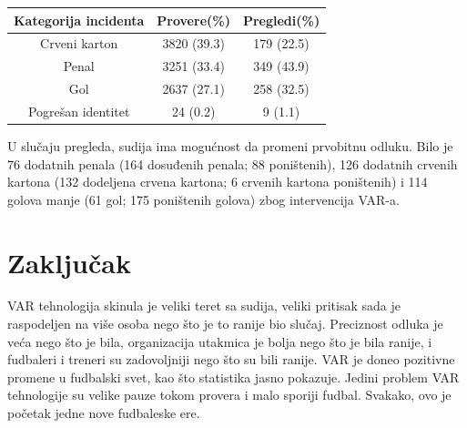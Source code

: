 \documentclass[a4paper]{article}
\begin{document}
\begin{center}
\begin{tabular}{ |c|c|c| } 
\hline
Kategorija incidenta & Provere(\%) & Pregledi(\%) \\  \hline
 Crveni karton & 3820 (39.3) & 179 (22.5) \\ \hline
 Penal & 3251 (33.4) & 349 (43.9) \\ \hline
 Gol & 2637 (27.1) & 258 (32.5) \\ \hline
 Pogrešan identitet & 24 (0.2) & 9 (1.1) \\
 \hline
\end{tabular}
\end{center}

U slučaju pregleda, sudija ima mogućnost da promeni prvobitnu odluku. Bilo je 76 dodatnih penala (164 dosuđenih penala; 88 poništenih), 126 dodatnih crvenih kartona (132 dodeljena crvena kartona; 6 crvenih kartona poništenih) i 114 golova manje (61 gol; 175 poništenih golova) zbog intervencija VAR-a.

\section{Zaključak}
VAR tehnologija skinula je veliki teret sa sudija, veliki pritisak sada je raspodeljen na više osoba nego što je to ranije bio slučaj. Preciznost odluka je veća nego što je bila, organizacija utakmica je bolja nego što je bila ranije, i fudbaleri i treneri su zadovoljniji nego što su bili ranije. VAR je doneo pozitivne promene u fudbalski svet, kao što statistika jasno pokazuje. Jedini problem VAR tehnologije su velike pauze tokom provera i malo sporiji fudbal. Svakako, ovo je početak jedne nove fudbaleske ere.


\appendix

\end{document}
